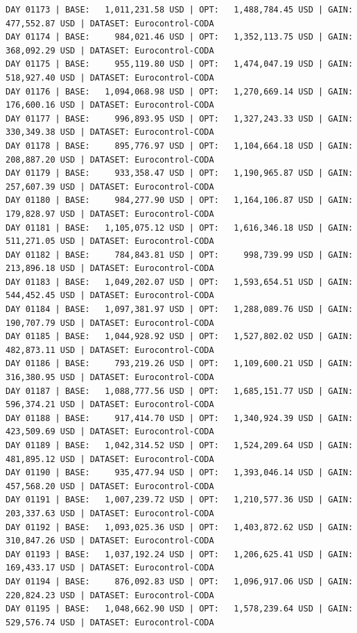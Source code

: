 \documentclass[11pt,a4paper]{article}
\begin{document}
\begin{verbatim}
DAY 01173 | BASE:   1,011,231.58 USD | OPT:   1,488,784.45 USD | GAIN: 477,552.87 USD | DATASET: Eurocontrol-CODA
DAY 01174 | BASE:     984,021.46 USD | OPT:   1,352,113.75 USD | GAIN: 368,092.29 USD | DATASET: Eurocontrol-CODA
DAY 01175 | BASE:     955,119.80 USD | OPT:   1,474,047.19 USD | GAIN: 518,927.40 USD | DATASET: Eurocontrol-CODA
DAY 01176 | BASE:   1,094,068.98 USD | OPT:   1,270,669.14 USD | GAIN: 176,600.16 USD | DATASET: Eurocontrol-CODA
DAY 01177 | BASE:     996,893.95 USD | OPT:   1,327,243.33 USD | GAIN: 330,349.38 USD | DATASET: Eurocontrol-CODA
DAY 01178 | BASE:     895,776.97 USD | OPT:   1,104,664.18 USD | GAIN: 208,887.20 USD | DATASET: Eurocontrol-CODA
DAY 01179 | BASE:     933,358.47 USD | OPT:   1,190,965.87 USD | GAIN: 257,607.39 USD | DATASET: Eurocontrol-CODA
DAY 01180 | BASE:     984,277.90 USD | OPT:   1,164,106.87 USD | GAIN: 179,828.97 USD | DATASET: Eurocontrol-CODA
DAY 01181 | BASE:   1,105,075.12 USD | OPT:   1,616,346.18 USD | GAIN: 511,271.05 USD | DATASET: Eurocontrol-CODA
DAY 01182 | BASE:     784,843.81 USD | OPT:     998,739.99 USD | GAIN: 213,896.18 USD | DATASET: Eurocontrol-CODA
DAY 01183 | BASE:   1,049,202.07 USD | OPT:   1,593,654.51 USD | GAIN: 544,452.45 USD | DATASET: Eurocontrol-CODA
DAY 01184 | BASE:   1,097,381.97 USD | OPT:   1,288,089.76 USD | GAIN: 190,707.79 USD | DATASET: Eurocontrol-CODA
DAY 01185 | BASE:   1,044,928.92 USD | OPT:   1,527,802.02 USD | GAIN: 482,873.11 USD | DATASET: Eurocontrol-CODA
DAY 01186 | BASE:     793,219.26 USD | OPT:   1,109,600.21 USD | GAIN: 316,380.95 USD | DATASET: Eurocontrol-CODA
DAY 01187 | BASE:   1,088,777.56 USD | OPT:   1,685,151.77 USD | GAIN: 596,374.21 USD | DATASET: Eurocontrol-CODA
DAY 01188 | BASE:     917,414.70 USD | OPT:   1,340,924.39 USD | GAIN: 423,509.69 USD | DATASET: Eurocontrol-CODA
DAY 01189 | BASE:   1,042,314.52 USD | OPT:   1,524,209.64 USD | GAIN: 481,895.12 USD | DATASET: Eurocontrol-CODA
DAY 01190 | BASE:     935,477.94 USD | OPT:   1,393,046.14 USD | GAIN: 457,568.20 USD | DATASET: Eurocontrol-CODA
DAY 01191 | BASE:   1,007,239.72 USD | OPT:   1,210,577.36 USD | GAIN: 203,337.63 USD | DATASET: Eurocontrol-CODA
DAY 01192 | BASE:   1,093,025.36 USD | OPT:   1,403,872.62 USD | GAIN: 310,847.26 USD | DATASET: Eurocontrol-CODA
DAY 01193 | BASE:   1,037,192.24 USD | OPT:   1,206,625.41 USD | GAIN: 169,433.17 USD | DATASET: Eurocontrol-CODA
DAY 01194 | BASE:     876,092.83 USD | OPT:   1,096,917.06 USD | GAIN: 220,824.23 USD | DATASET: Eurocontrol-CODA
DAY 01195 | BASE:   1,048,662.90 USD | OPT:   1,578,239.64 USD | GAIN: 529,576.74 USD | DATASET: Eurocontrol-CODA

\end{verbatim}
\end{document}
